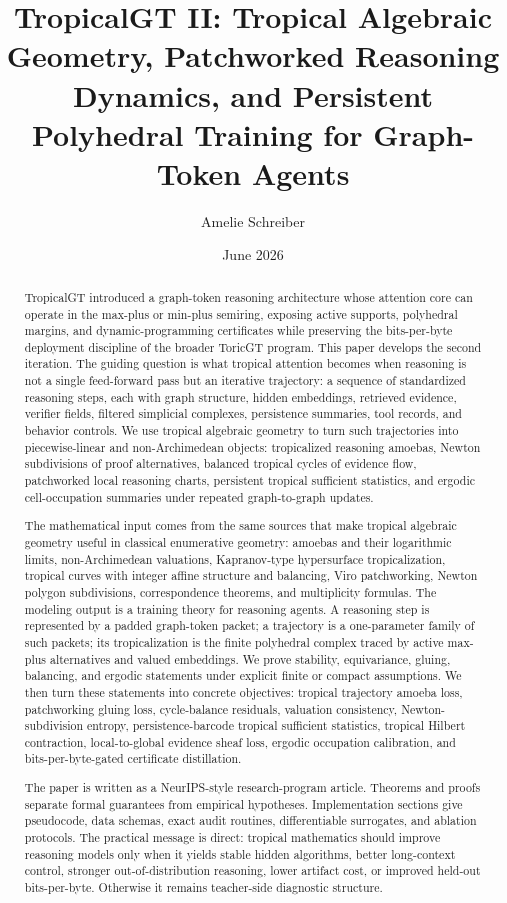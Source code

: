 \documentclass[11pt]{article}
\title{\vspace{-1.4em}\textbf{TropicalGT II: Tropical Algebraic Geometry, Patchworked Reasoning Dynamics, and Persistent Polyhedral Training for Graph-Token Agents}}
\author{Amelie Schreiber}
\date{June 2026}
\begin{document}
\maketitle

\begin{abstract}
TropicalGT introduced a graph-token reasoning architecture whose attention core can operate in the max-plus or min-plus semiring, exposing active supports, polyhedral margins, and dynamic-programming certificates while preserving the bits-per-byte deployment discipline of the broader ToricGT program.  This paper develops the second iteration.  The guiding question is what tropical attention becomes when reasoning is not a single feed-forward pass but an iterative trajectory: a sequence of standardized reasoning steps, each with graph structure, hidden embeddings, retrieved evidence, verifier fields, filtered simplicial complexes, persistence summaries, tool records, and behavior controls.  We use tropical algebraic geometry to turn such trajectories into piecewise-linear and non-Archimedean objects: tropicalized reasoning amoebas, Newton subdivisions of proof alternatives, balanced tropical cycles of evidence flow, patchworked local reasoning charts, persistent tropical sufficient statistics, and ergodic cell-occupation summaries under repeated graph-to-graph updates.

The mathematical input comes from the same sources that make tropical algebraic geometry useful in classical enumerative geometry: amoebas and their logarithmic limits, non-Archimedean valuations, Kapranov-type hypersurface tropicalization, tropical curves with integer affine structure and balancing, Viro patchworking, Newton polygon subdivisions, correspondence theorems, and multiplicity formulas.  The modeling output is a training theory for reasoning agents.  A reasoning step is represented by a padded graph-token packet; a trajectory is a one-parameter family of such packets; its tropicalization is the finite polyhedral complex traced by active max-plus alternatives and valued embeddings.  We prove stability, equivariance, gluing, balancing, and ergodic statements under explicit finite or compact assumptions.  We then turn these statements into concrete objectives: tropical trajectory amoeba loss, patchworking gluing loss, cycle-balance residuals, valuation consistency, Newton-subdivision entropy, persistence-barcode tropical sufficient statistics, tropical Hilbert contraction, local-to-global evidence sheaf loss, ergodic occupation calibration, and bits-per-byte-gated certificate distillation.

The paper is written as a NeurIPS-style research-program article.  Theorems and proofs separate formal guarantees from empirical hypotheses.  Implementation sections give pseudocode, data schemas, exact audit routines, differentiable surrogates, and ablation protocols.  The practical message is direct: tropical mathematics should improve reasoning models only when it yields stable hidden algorithms, better long-context control, stronger out-of-distribution reasoning, lower artifact cost, or improved held-out bits-per-byte.  Otherwise it remains teacher-side diagnostic structure.
\end{abstract}
\end{document}
